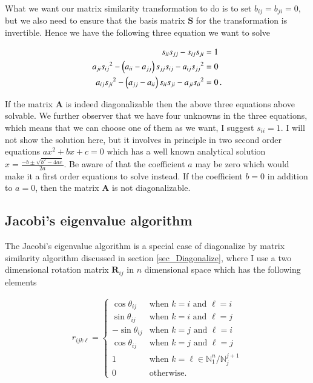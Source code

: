 \documentclass[11pt,english,a4paper]{article}
\begin{document}
\begin{flushleft}
What we want our matrix similarity transformation to do is to set $b_{ij} = b_{ji} = 0$, but we also need to ensure that the basis matrix $\mathbf{S}$ for the transformation is invertible. Hence we have the following three equation we want to solve 

\begin{align}
s_{ii} s_{jj} - s_{ij} s_{ji} &= 1 
\label{eq_10}\\
a_{ji} {s_{ij}}^2-\left({a_{ii}-a_{jj}}\right)s_{jj}s_{ij} - a_{ij}{s_{jj}}^2 &= 0 \label{eq_11}\\
a_{ij} {s_{ji}}^2 - \left({a_{jj}-a_{ii}}\right)s_{ii}s_{ji} - a_{ji}{s_{ii}}^2 &= 0 \,. \label{eq_12}
\end{align} 

If the matrix $\mathbf{A}$ is indeed diagonalizable then the above three equations above solvable. We further observer that we have four unknowns in the three equations, which means that we can choose one of them as we want, I suggest $s_{ii}=1$. I will not show the solution here, but it involves in principle in two second order equations $a x^2 + b x + c = 0$ which has a well known analytical solution $x = \frac{-b\pm\sqrt{b^2 - 4ac}}{2a}$. Be aware of that the coefficient $a$ may be zero which would make it a first order equations to solve instead. If the coefficient $b=0$ in addition to $a=0$, then the matrix $\mathbf{A}$ is not diagonalizable. \linebreak

\subsection{Jacobi's eigenvalue algorithm} \label{sec_Jacobi}

The Jacobi's eigenvalue algorithm is a special case of diagonalize by matrix similarity algorithm discussed in section \ref{sec_Diagonalize}, where I use a two dimensional rotation matrix $\textbf{R}_{ij}$ in $n$ dimensional space which has the following elements

\begin{align}
r_{ijk\ell} = \begin{cases} \cos\theta_{ij} & \text{when $k=i$ and $\ell=i$} \\ \sin\theta_{ij} & \text{when $k=i$ and $\ell=j$} \\ -\sin\theta_{ij} & \text{when $k=j$ and $\ell=i$} \\ \cos\theta_{ij} & \text{when $k=j$ and $\ell=j$}\\ 1 & \text{when } k=\ell\in\mathbb{N}_1^n / \mathbb{N}_j^{j+1}  \\ 0 & \text{otherwise.}\end{cases}
\label{eq_13}
\end{align} 


\end{flushleft}
\end{document}
